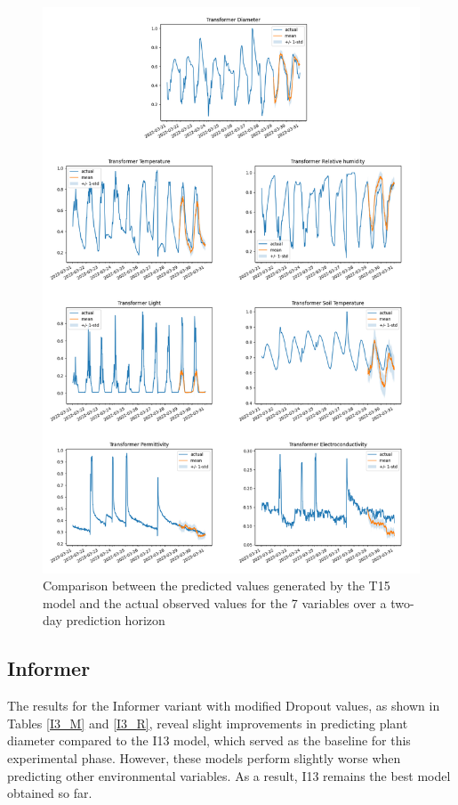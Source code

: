 \begin{figure}[htbp]
    \centering
    \includegraphics[width=15 cm]{6_ChapterResults/figuras/T15.png}
    \caption{Comparison between the predicted values generated by the T15 model and the actual observed values for the 7 variables over a two-day prediction horizon}
    \label{T15}
\end{figure}

\subsection{Informer}
The results for the Informer variant with modified Dropout values, as shown in Tables \ref{I3_M} and \ref{I3_R}, reveal slight improvements in predicting plant diameter compared to the I13 model, which served as the baseline for this experimental phase. However, these models perform slightly worse when predicting other environmental variables. As a result, I13 remains the best model obtained so far.

